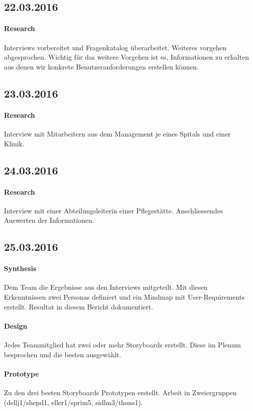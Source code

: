 \documentclass[a4paper]{scrreprt}
\begin{document}
\subsection*{22.03.2016}
\paragraph{Research}
Interviews vorbereitet und Fragenkatalog überarbeitet. Weiteres vorgehen abgesprochen. Wichtig für das weitere Vorgehen ist es, Informationen zu erhalten aus denen wir konkrete Benutzeranforderungen erstellen können.


\subsection*{23.03.2016}
\paragraph{Research}
Interview mit Mitarbeitern aus dem Management je eines Spitals und einer Klinik.


\subsection*{24.03.2016}
\paragraph{Research}
Interview mit einer Abteilungsleiterin einer Pflegestätte. Anschliessendes Auswerten der Informationen.

\subsection*{25.03.2016}
\paragraph{Synthesis}
Dem Team die Ergebnisse aus den Interviews mitgeteilt. Mit diesen Erkenntnissen zwei Personas definiert und ein Mindmap mit User-Requirements erstellt. Resultat in diesem Bericht dokumentiert.

\paragraph{Design}
Jedes Teammitglied hat zwei oder mehr Storyboards erstellt. Diese im Plenum besprochen und die besten ausgewählt. 

\paragraph{Prototype}
Zu den drei besten Storyboards Prototypen erstellt. Arbeit in Zweiergruppen (dellj1/shepd1, eller1/sprim5, sidlm3/thons1).
\end{document}
